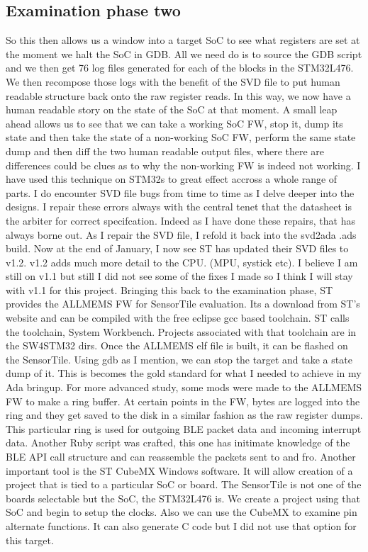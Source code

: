 \documentclass[11pt]{article}
\numberwithin{figure}{section}
\begin{document}
\subsection{Examination phase two}
So this then allows us a window into a target SoC to see what
registers are set at the moment we halt the SoC in GDB. All we need do
is to source the GDB script and we then get 76 log files generated for
each of the blocks in the STM32L476. We then recompose those logs with
the benefit of the SVD file to put human readable structure back onto
the raw register reads. In this way, we now have a human readable
story on the state of the SoC at that moment. A small leap ahead
allows us to see that we can take a working SoC FW, stop it, dump its
state and then take the state of a non-working SoC FW, perform the
same state dump and then diff the two human readable output files,
where there are differences could be clues as to why the non-working
FW is indeed not working. I have used this technique on STM32s to
great effect accross a whole range of parts. I do encounter SVD file
bugs from time to time as I delve deeper into the designs. I repair
these errors always with the central tenet that the datasheet is the
arbiter for correct specifcation. Indeed as I have done these repairs,
that has always borne out. As I repair the SVD file, I refold it back
into the svd2ada {.ads} build. Now at the end of January, I now see ST
has updated their SVD files to v1.2. v1.2 adds much more detail to the
CPU. (MPU, systick etc). I believe I am still on v1.1 but still I did
not see some of the fixes I made so I think I will stay with v1.1 for
this project.  Bringing this back to the examination phase, ST
provides the ALLMEMS FW for SensorTile evaluation. Its a download from
ST's website and can be compiled with the free eclipse gcc based
toolchain. ST calls the toolchain, System Workbench. Projects
associated with that toolchain are in the SW4STM32 dirs. Once the
ALLMEMS elf file is built, it can be flashed on the SensorTile. Using
gdb as I mention, we can stop the target and take a state dump of
it. This is becomes the gold standard for what I needed to achieve in
my Ada bringup. For more advanced study, some mods were made to the
ALLMEMS FW to make a ring buffer. At certain points in the FW, bytes
are logged into the ring and they get saved to the disk in a similar
fashion as the raw register dumps. This particular ring is used for
outgoing BLE packet data and incoming interrupt data. Another Ruby
script was crafted, this one has initimate knowledge of the BLE API
call structure and can reassemble the packets sent to and fro. Another
important tool is the ST CubeMX Windows software. It will allow
creation of a project that is tied to a particular SoC or board. The
SensorTile is not one of the boards selectable but the SoC, the
STM32L476 is. We create a project using that SoC and begin to setup
the clocks. Also we can use the CubeMX to examine pin alternate
functions. It can also generate C code but I did not use that option
for this target.
\end{document}
